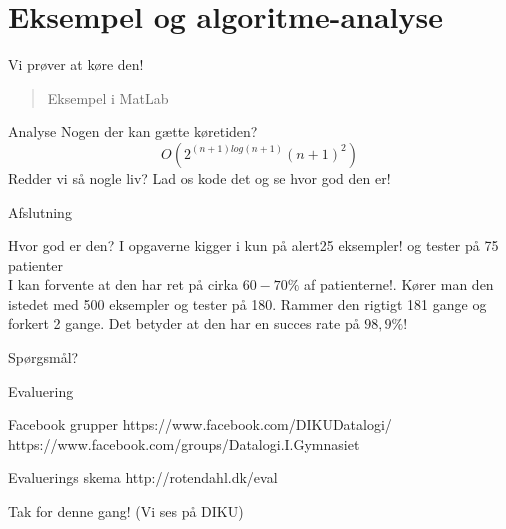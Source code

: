 \documentclass[12pt,t]{beamer}
\begin{document}
\section{Eksempel og algoritme-analyse}
\frame{\tableofcontents[currentsection]}
    \begin{frame}[t]{Vi prøver at køre den!}
        \begin{quote}
            Eksempel i MatLab
        \end{quote}
        \pause
        \begin{block}{Analyse}
            Nogen der kan gætte køretiden? \pause
            $$
                O(2^{(n+1) log(n+1)} (n + 1)^2)
            $$
                \pause
                Redder vi så nogle liv?
                \pause
                Lad os kode det og se hvor god den er!
            \end{block}
    \end{frame}

    \begin{frame}[t]{Afslutning}
    \begin{block}{Hvor god er den? }
        I opgaverne kigger i kun på alert{25 eksempler!} og tester på 75
        patienter \\
        \pause
        I kan forvente at den har ret på cirka $60-70\%$ af patienterne!.
        \pause
        Kører man den istedet med 500 eksempler og tester på 180. \pause
        Rammer den rigtigt 181 gange og forkert 2 gange. Det betyder at den
        har en succes rate på \alert{$98,9\%$!}
    \end{block}
    \pause
    \centering Spørgsmål?\\
    \end{frame}

    \begin{frame}[c]{Evaluering}
    \begin{block}{Facebook grupper}
        \centering
        https://www.facebook.com/DIKUDatalogi/ \\
        https://www.facebook.com/groups/Datalogi.I.Gymnasiet
    \end{block}
    \pause
    \begin{block}{Evaluerings skema}
        \centering
        http://rotendahl.dk/eval
    \end{block}
    \pause Tak for denne gang! (Vi ses på DIKU)
    \end{frame}
\end{document}
